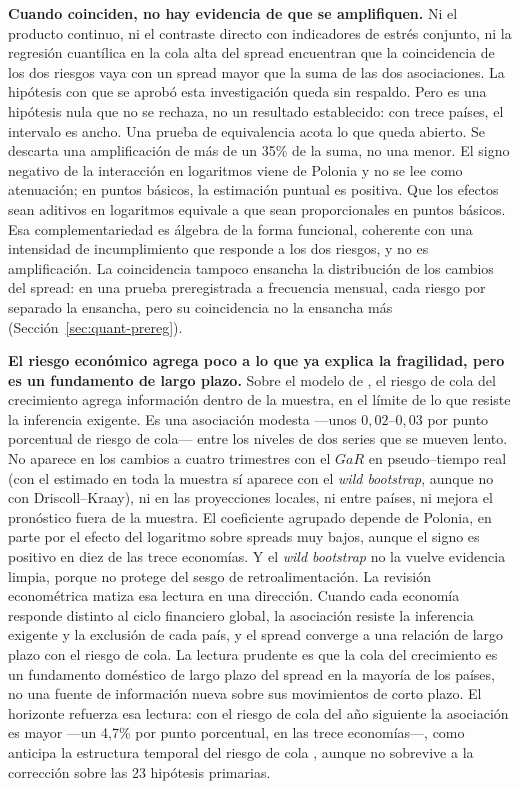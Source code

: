 \textbf{Cuando coinciden, no hay evidencia de que se amplifiquen.} Ni el producto continuo, ni el contraste directo con indicadores de estrés conjunto, ni la regresión cuantílica en la cola alta del spread encuentran que la coincidencia de los dos riesgos vaya con un spread mayor que la suma de las dos asociaciones. La hipótesis con que se aprobó esta investigación queda sin respaldo. Pero es una hipótesis nula que no se rechaza, no un resultado establecido: con trece países, el intervalo es ancho. Una prueba de equivalencia acota lo que queda abierto. Se descarta una amplificación de más de un 35\% de la suma, no una menor. El signo negativo de la interacción en logaritmos viene de Polonia y no se lee como atenuación; en puntos básicos, la estimación puntual es positiva. Que los efectos sean aditivos en logaritmos equivale a que sean proporcionales en puntos básicos. Esa complementariedad es álgebra de la forma funcional, coherente con una intensidad de incumplimiento que responde a los dos riesgos, y no es amplificación. La coincidencia tampoco ensancha la distribución de los cambios del spread: en una prueba preregistrada a frecuencia mensual, cada riesgo por separado la ensancha, pero su coincidencia no la ensancha más (Sección~\ref{sec:quant-prereg}).

\textbf{El riesgo económico agrega poco a lo que ya explica la fragilidad, pero es un fundamento de largo plazo.} Sobre el modelo de \citet{Chari2024b}, el riesgo de cola del crecimiento agrega información dentro de la muestra, en el límite de lo que resiste la inferencia exigente. Es una asociación modesta ---unos $0{,}02$--$0{,}03$ por punto porcentual de riesgo de cola--- entre los niveles de dos series que se mueven lento. No aparece en los cambios a cuatro trimestres con el $GaR$ en pseudo--tiempo real (con el estimado en toda la muestra sí aparece con el \textit{wild bootstrap}, aunque no con Driscoll--Kraay), ni en las proyecciones locales, ni entre países, ni mejora el pronóstico fuera de la muestra. El coeficiente agrupado depende de Polonia, en parte por el efecto del logaritmo sobre spreads muy bajos, aunque el signo es positivo en diez de las trece economías. Y el \textit{wild bootstrap} no la vuelve evidencia limpia, porque no protege del sesgo de retroalimentación. La revisión econométrica matiza esa lectura en una dirección. Cuando cada economía responde distinto al ciclo financiero global, la asociación resiste la inferencia exigente y la exclusión de cada país, y el spread converge a una relación de largo plazo con el riesgo de cola. La lectura prudente es que la cola del crecimiento es un fundamento doméstico de largo plazo del spread en la mayoría de los países, no una fuente de información nueva sobre sus movimientos de corto plazo. El horizonte refuerza esa lectura: con el riesgo de cola del año siguiente la asociación es mayor ---un 4,7\% por punto porcentual, en las trece economías---, como anticipa la estructura temporal del riesgo de cola \citep{AdrianEtAl2022}, aunque no sobrevive a la corrección sobre las 23 hipótesis primarias.

